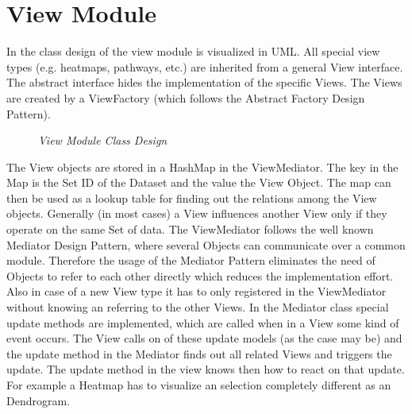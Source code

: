 \section{View Module}

In  the class design of the view module is visualized in UML.
All special view types (e.g. heatmaps, pathways, etc.) are inherited from a general View interface.
The abstract interface hides the implementation of the specific Views.
The Views are created by a ViewFactory (which follows the Abstract Factory Design Pattern).

\begin{figure}[ht]
\centering
{} 
\caption[View Module Class Design]{\textit{View Module Class Design}} 
\label{gfx:view_module_class_design}
\end{figure}

The View objects are stored in a HashMap in the ViewMediator. The key in the Map is the Set ID of the Dataset and the value the View Object. The map can then be used as a lookup table for finding out the relations among the View objects. Generally (in most cases) a View influences another View only if they operate on the same Set of data. 
The ViewMediator follows the well known Mediator Design Pattern, where several Objects can communicate over a common module.
Therefore the usage of the Mediator Pattern eliminates the need of Objects to refer to each other directly which reduces the implementation effort. Also in case of a new View type it has to only registered in the ViewMediator without knowing an referring to the other Views. In the Mediator class special update methods are implemented, which are called when in a View some kind of event occurs. The View calls on of these update models (as the case may be) and the update method in the Mediator finds out all related Views and triggers the update. The update method in the view knows then how to react on that update. For example a Heatmap has to visualize an selection completely different as an Dendrogram.

